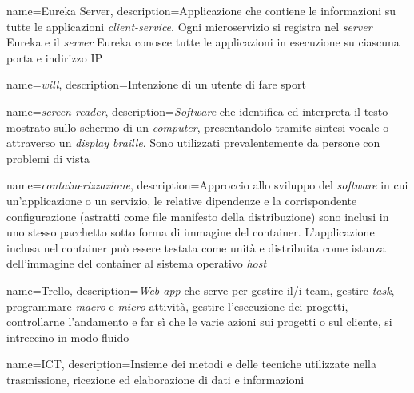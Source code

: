 {
    name={Eureka Server},
    description={Applicazione che contiene le informazioni su tutte le
            applicazioni \textit{client-service}. Ogni \gls{microservizio} si registra nel
            \textit{server} Eureka e il \textit{server} Eureka conosce tutte le
            applicazioni in esecuzione su ciascuna porta e indirizzo \gls{IP}}
}

{
    name={\textit{will}},
    description={Intenzione di un utente di fare sport}
}

{
    name={\textit{screen reader}},
    description={\textit{Software} che identifica ed interpreta il testo
            mostrato sullo schermo di un \textit{computer}, presentandolo tramite sintesi
            vocale o attraverso un \textit{display braille}. Sono utilizzati
            prevalentemente da persone con problemi di vista}
}

{
    name={\textit{containerizzazione}},
    description={Approccio allo sviluppo del \textit{software} in cui
            un'applicazione o un servizio, le relative dipendenze e la corrispondente
            configurazione (astratti come file manifesto della distribuzione) sono inclusi
            in uno stesso pacchetto sotto forma di immagine del \gls{container}.
            L'applicazione inclusa nel \gls{container} può essere testata come unità e
            distribuita come istanza dell'immagine del \gls{container} al sistema operativo
            \textit{host}}
}

{
    name={Trello},
    description={\textit{Web app} che serve per gestire il/i team, gestire
            \textit{task}, programmare \textit{macro} e \textit{micro} attività, gestire
            l'esecuzione dei progetti, controllarne l'andamento e far sì che le varie
            azioni sui progetti o sul cliente, si intreccino in modo fluido}
}

{
    name={ICT},
    description={Insieme dei metodi e delle tecniche utilizzate nella
            trasmissione, ricezione ed elaborazione di dati e informazioni}
}

